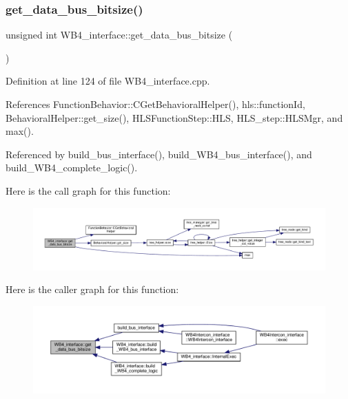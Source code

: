 \subsubsection{\texorpdfstring{get\+\_\+data\+\_\+bus\+\_\+bitsize()}{get\_data\_bus\_bitsize()}}
{\footnotesize\ttfamily unsigned int W\+B4\+\_\+interface\+::get\+\_\+data\+\_\+bus\+\_\+bitsize (\begin{DoxyParamCaption}{ }\end{DoxyParamCaption})\hspace{0.3cm}{\ttfamily [protected]}}



Definition at line 124 of file W\+B4\+\_\+interface.\+cpp.



References Function\+Behavior\+::\+C\+Get\+Behavioral\+Helper(), hls\+::function\+Id, Behavioral\+Helper\+::get\+\_\+size(), H\+L\+S\+Function\+Step\+::\+H\+LS, H\+L\+S\+\_\+step\+::\+H\+L\+S\+Mgr, and max().



Referenced by build\+\_\+bus\+\_\+interface(), build\+\_\+\+W\+B4\+\_\+bus\+\_\+interface(), and build\+\_\+\+W\+B4\+\_\+complete\+\_\+logic().

Here is the call graph for this function\+:
\nopagebreak
\begin{figure}[H]
\begin{center}
\leavevmode
\includegraphics[width=350pt]{d5/d7a/classWB4__interface_a0ea7f395d607ba25bdb832ee47c0d68c_cgraph}
\end{center}
\end{figure}
Here is the caller graph for this function\+:
\nopagebreak
\begin{figure}[H]
\begin{center}
\leavevmode
\includegraphics[width=350pt]{d5/d7a/classWB4__interface_a0ea7f395d607ba25bdb832ee47c0d68c_icgraph}
\end{center}
\end{figure}
\mbox{\label{classWB4__interface_ad041a3291160ebf2a0c852ac9ff70a5e}} 
